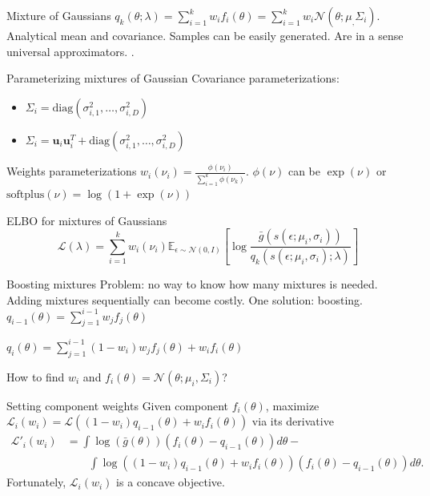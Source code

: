 \documentclass{beamer}
\def \Ev {{\mathbb E}}
\def \u {{\mathbf u}}
\def \gu {{\bar{g}}}
\begin{document}
\begin{frame}{}
\begin{block}{Mixture of Gaussians}
$q_k(\theta;\lambda) = \sum_{i=1}^k w_i f_i(\theta) = \sum_{i=1}^k w_i \mathcal{N}(\theta;\mu_,\Sigma_i)$. Analytical mean and covariance. Samples can be easily generated. Are in a sense universal approximators. .
\end{block}
\begin{block}{Parameterizing mixtures of Gaussian}
Covariance parameterizations: 
\begin{itemize}
\item $\Sigma_i = \text{diag}(\sigma_{i,1}^2,\ldots,\sigma_{i,D}^2)$
\item $\Sigma_i = \u_i \u_i^T + \text{diag}(\sigma_{i,1}^2,\ldots,\sigma_{i,D}^2)$
\end{itemize}

Weights parameterizations $w_i(\nu_i) = \frac{\phi(\nu_i)}{\sum_{i=1}^k \phi(\nu_k)}$. $\phi(\nu)$ can be $\exp(\nu)$ or $\text{softplus}(\nu) = \log(1+\exp(\nu))$
\end{block}
\begin{block}{ELBO for mixtures of Gaussians}
\begin{equation*}
\mathcal{L}(\lambda) = \sum_{i=1}^k w_i(\nu_i) \Ev_{\epsilon \sim \mathcal{N}(0,I)}\left[\log \frac{ \gu(s(\epsilon;\mu_i,\sigma_i))}{q_k(s(\epsilon;\mu_i,\sigma_i);\lambda)}\right]
\end{equation*}
\end{block}
\end{frame}

\begin{frame}{}
\begin{block}{Boosting mixtures}
Problem: no way to know how many mixtures is needed. Adding mixtures sequentially can become costly. One solution: boosting.
$q_{i-1}(\theta) = \sum_{j=1}^{i-1} w_j f_j(\theta)$

$q_{i}(\theta) = \sum_{j=1}^{i-1} (1-w_{i}) w_j f_j(\theta) + w_{i} f_i(\theta)$

How to find $w_{i}$ and $f_i(\theta) = \mathcal{N}(\theta;\mu_{i},\Sigma_{i})$?
\end{block}
\begin{block}{Setting component weights}
Given component $f_i(\theta)$, maximize 
$\mathcal{L}_i(w_i) = \mathcal{L}((1-w_{i}) q_{i-1}(\theta) + w_{i} f_i(\theta))$
via its derivative
\begin{equation*}
\begin{split}
\mathcal{L}'_{i}(w_{i}) & = \int \log (\gu(\theta)) (f_{i}(\theta) - q_{i-1}(\theta)) d\theta - \\
& \qquad{} \int \log((1-w_{i}) q_{i-1}(\theta) + w_{i} f_{i}(\theta)) (f_i(\theta) - q_{i-1}(\theta)) d\theta.
\end{split}
\end{equation*}
Fortunately, $\mathcal{L}_i(w_i)$ is a concave objective.
\end{block}
\end{frame}
\end{document}
